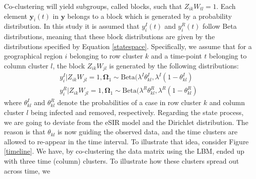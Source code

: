 \documentclass[10pt,a4paper]{article}
\begin{document}
Co-clustering will yield subgroups, called blocks, such that $Z_{ik} W_{tl} = 1$. Each element $\mathbf{y}_{i}(t)$ in $\mathbf{y}$ belongs to a block which is generated by a probability distribution. In this study it is assumed that $y_{i}^I(t)$ and $y_{i}^R(t)$ follow Beta distributions, meaning that these block distributions are given by the distributions specified by Equation \ref{statespace}. Specifically, we assume that for a geographical region $i$ belonging to row cluster $k$ and a time-point $t$ belonging to column cluster $l$, the block $Z_{ik}W_{jl}$ is generated by the following distributions: 
%
\begin{equation}\label{statespace-observed}
	\begin{aligned}
		y_{i}^I | Z_{ik}W_{jl} = 1, \boldsymbol{\Omega}_1 \sim \text{Beta}(\lambda^I \theta_{kl}^I, \lambda^I(1 - \theta_{kl}^I) \\
		y_{i}^R | Z_{ik}W_{jl} = 1, \boldsymbol{\Omega}_1 \sim \text{Beta}(\lambda^R \theta_{kl}^R, \lambda^R(1 - \theta_{kl}^R)
	\end{aligned}
\end{equation}
% 
%
%
where  
%
$
\theta_{kl}^I
$
%
and 
%
$
\theta_{kl}^R
$
%
denote the probabilities of a case in row cluster $k$ and column cluster $l$ being infected and removed, respectively. Regarding the state process, we are going to deviate from the eSIR model and the Dirichlet distribution. The reason is that $\theta_{kl}$ is now guiding the observed data, and the time clusters are allowed to re-appear in the time interval. To illustrate that idea, consider Figure \ref{timeline}. We have, by co-clustering the data matrix using the LBM, ended up with three time (column) clusters. To illustrate how these clusters spread out across time, we 
\end{document}
